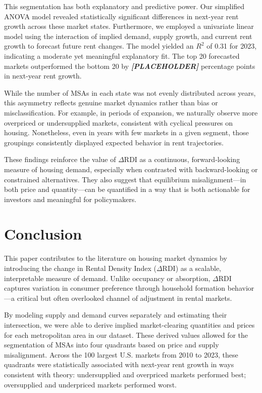 \documentclass[sn-mathphys-num]{sn-jnl}%
\begin{document}
This segmentation has both explanatory and predictive power. Our simplified ANOVA model revealed statistically significant differences in next-year rent growth across these market states. Furthermore, we employed a univariate linear model using the interaction of implied demand, supply growth, and current rent growth to forecast future rent changes. The model yielded an \(R^2\) of 0.31 for 2023, indicating a moderate yet meaningful explanatory fit. The top 20 forecasted markets outperformed the bottom 20 by \textbf{\textit{[PLACEHOLDER]}} percentage points in next-year rent growth.

While the number of MSAs in each state was not evenly distributed across years, this asymmetry reflects genuine market dynamics rather than bias or misclassification. For example, in periods of expansion, we naturally observe more overpriced or undersupplied markets, consistent with cyclical pressures on housing. Nonetheless, even in years with few markets in a given segment, those groupings consistently displayed expected behavior in rent trajectories.

These findings reinforce the value of \(\Delta\text{RDI}\) as a continuous, forward-looking measure of housing demand, especially when contrasted with backward-looking or constrained alternatives. They also suggest that equilibrium misalignment---in both price and quantity---can be quantified in a way that is both actionable for investors and meaningful for policymakers.

\section*{Conclusion}

This paper contributes to the literature on housing market dynamics by introducing the change in Rental Density Index (\(\Delta\text{RDI}\)) as a scalable, interpretable measure of demand. Unlike occupancy or absorption, \(\Delta\text{RDI}\) captures variation in consumer preference through household formation behavior---a critical but often overlooked channel of adjustment in rental markets.

By modeling supply and demand curves separately and estimating their intersection, we were able to derive implied market-clearing quantities and prices for each metropolitan area in our dataset. These derived values allowed for the segmentation of MSAs into four quadrants based on price and supply misalignment. Across the 100 largest U.S. markets from 2010 to 2023, these quadrants were statistically associated with next-year rent growth in ways consistent with theory: undersupplied and overpriced markets performed best; oversupplied and underpriced markets performed worst.
\end{document}
